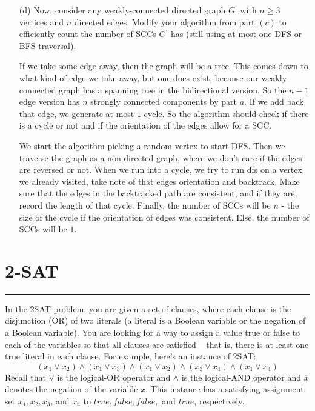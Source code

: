 \documentclass{article}
\begin{document}
\begin{itemize}
        \item [(d)] Now, consider any weakly-connected directed graph $G^{\prime}$ with $n \geq 3$ vertices and $n$ directed edges. Modify your algorithm from part $(c)$ to efficiently count the number of SCCs $G^{\prime}$ has (still using at most one DFS or BFS traversal). 
            \begin{answer}
                If we take some edge away, then the graph will be a tree. This comes down to what kind of edge we take away, but one does exist, because our weakly connected graph has a spanning tree in the bidirectional version. So the $n - 1$ edge version has $n$ strongly connected components by part $a$. If we add back that edge, we generate at most $1$ cycle. So the algorithm should check if there is a cycle or not and if the orientation of the edges allow for a SCC.

                We start the algorithm picking a random vertex to start DFS. Then we traverse the graph as a non directed graph, where we don't care if the edges are reversed or not. When we run into a cycle, we try to run dfs on a vertex we already visited, take note of that edges orientation and backtrack. Make sure that the edges in the backtracked path are consistent, and if they are, record the length of that cycle. Finally, the number of SCCs will be $n$ - the size of the cycle if the orientation of edges was consistent. Else, the number of SCCs will be $1$.
            \end{answer}
    \end{itemize}

\newpage
\section*{2-SAT}
\hrule

In the 2SAT problem, you are given a set of clauses, where each clause is the disjunction (OR) of two literals (a literal is a Boolean variable or the negation of a Boolean variable). You are looking for a way to assign a value true or false to each of the variables so that all clauses are satisfied – that is, there is at least one true literal in each clause. For example, here’s an instance of 2SAT:
    \begin{equation*}
        (x_{1} \lor \overline{x_{2}}) \land (\overline{x_{1}} \lor \overline{x_{3}}) \land (x_{1} \lor x_{2}) \land (\overline{x_{3}} \lor x_{4}) \land (\overline{x_{1}} \lor x_{4})
    \end{equation*}
Recall that $\lor$ is the logical-OR operator and $\land$ is the logical-AND operator and $\overline{x}$ denotes the negation of the variable $x$. This instance has a satisfying assignment: set $x_{1}, x_{2}, x_{3}$, and $x_{4}$ to $true, false, false,$ and $true$, respectively.
\end{document}
